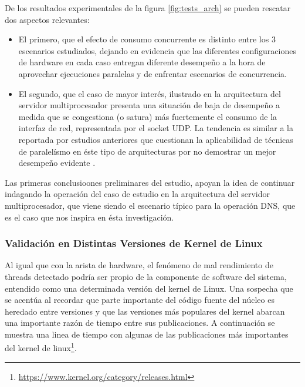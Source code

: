 De los resultados experimentales de la figura \ref{fig:tests_arch} se pueden rescatar dos aspectos relevantes:
\begin{itemize}
\item El primero, que el efecto de consumo concurrente es distinto entre los 3 escenarios estudiados, dejando en evidencia que las diferentes configuraciones de hardware en cada caso entregan diferente desempeño a la hora de aprovechar ejecuciones paralelas y de enfrentar escenarios de concurrencia.
\item El segundo, que el caso de mayor interés, ilustrado en la arquitectura del servidor multiprocesador presenta una situación de baja de desempeño a medida que se congestiona (o satura) más fuertemente el consumo de la interfaz de red, representada por el socket UDP. La tendencia es similar a la reportada por estudios anteriores que cuestionan la aplicabilidad de técnicas de paralelísmo en éste tipo de arquitecturas por no demostrar un mejor desempeño evidente \cite{post:facebook, paper:toshiba, tesis:diegoDCC}.
\end{itemize}
Las primeras conclusioones preliminares del estudio, apoyan la idea de continuar indagando la operación del caso de estudio en la arquitectura del servidor multiprocesador, que viene siendo el escenario típico para la operación DNS, que es el caso que nos inspira en ésta investigación.

\subsubsection{Validación en Distintas Versiones de Kernel de Linux}

Al igual que con la arista de hardware, el fenómeno de mal rendimiento de threads detectado podría ser propio de la componente de software del sistema, entendido como una determinada versión del kernel de Linux. Una sospecha que se acentúa al recordar que parte importante del código fuente del núcleo es heredado entre versiones y que las versiones más populares del kernel abarcan una importante razón de tiempo entre sus publicaciones. A continuación se muestra una linea de tiempo con algunas de las publicaciones más importantes del kernel de linux\footnote{\url{https://www.kernel.org/category/releases.html}}.


\begin{center}
\end{center}


